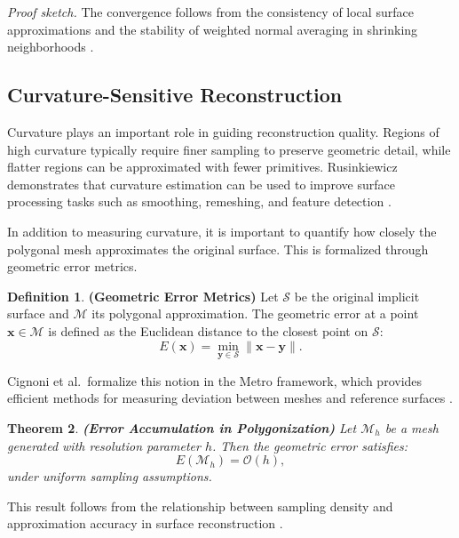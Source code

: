\documentclass[12pt, a4paper, oneside]{book}
\theoremstyle{plain}
\newtheorem{theorem}{Theorem}[chapter]
\theoremstyle{definition}
\newtheorem{definition}[theorem]{Definition}
\theoremstyle{remark}
\theoremstyle{definition}
\begin{document}
\textit{Proof sketch.} The convergence follows from the consistency of local surface
approximations and the stability of weighted normal averaging in shrinking neighborhoods
\cite{taubin1995estimating}.

\vspace{0.5em}

\subsection{Curvature-Sensitive Reconstruction}

Curvature plays an important role in guiding reconstruction quality. Regions of high
curvature typically require finer sampling to preserve geometric detail, while flatter
regions can be approximated with fewer primitives. Rusinkiewicz demonstrates that
curvature estimation can be used to improve surface processing tasks such as smoothing,
remeshing, and feature detection \cite{rusinkiewicz2004estimating}.

In addition to measuring curvature, it is important to quantify how closely the
polygonal mesh approximates the original surface. This is formalized through geometric
error metrics.

\vspace{0.5em}

\begin{definition}
    \textbf{(Geometric Error Metrics)}
Let $\mathcal{S}$ be the original implicit surface and $\mathcal{M}$ its polygonal
approximation. The geometric error at a point $\mathbf{x} \in \mathcal{M}$ is defined as
the Euclidean distance to the closest point on $\mathcal{S}$:
\[
E(\mathbf{x}) = \min_{\mathbf{y} \in \mathcal{S}} \|\mathbf{x} - \mathbf{y}\|.
\]
\end{definition}

Cignoni et al.\ formalize this notion in the Metro framework, which provides efficient
methods for measuring deviation between meshes and reference surfaces
\cite{cignoni1998metro}.

\vspace{0.5em}

\begin{theorem}
    \textbf{(Error Accumulation in Polygonization)}
Let $\mathcal{M}_h$ be a mesh generated with resolution parameter $h$. Then the
geometric error satisfies:
\[
E(\mathcal{M}_h) = \mathcal{O}(h),
\]
under uniform sampling assumptions.
\end{theorem}

This result follows from the relationship between sampling density and approximation
accuracy in surface reconstruction \cite{cignoni1998metro}.
\end{document}

